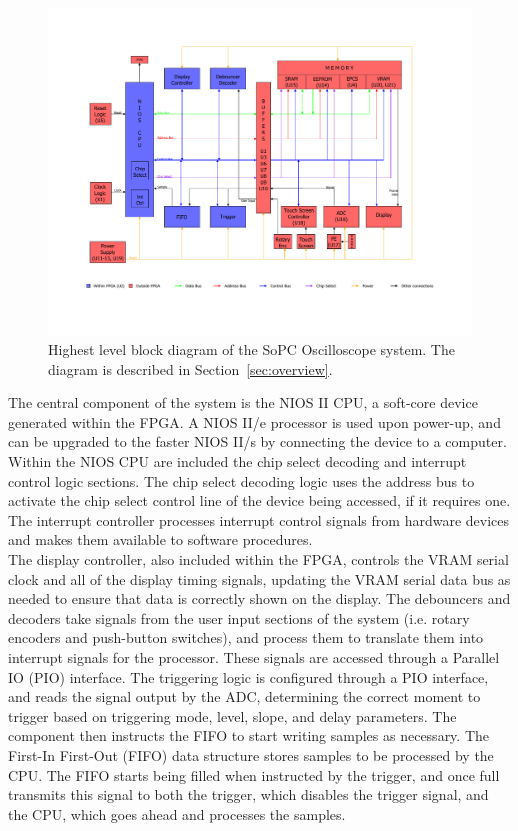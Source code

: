 \documentclass[titlepage]{scrartcl}
\begin{document}
	\begin{figure}[h!]
	\vspace{-4cm}
	\centerline{\includegraphics[width=29cm, angle=90, origin=c]{img/block_diagram.pdf}}
                	\caption{Highest level block diagram of the SoPC Oscilloscope system. The diagram is described in Section~\ref{sec:overview}.}
               	\label{fig:main_blocks}
	\end{figure}
	
	The central component of the system is the NIOS II CPU, a soft-core device generated within the FPGA. A NIOS II/e processor is used upon power-up, and can be upgraded to the faster NIOS II/s by connecting the device to a computer. Within the NIOS CPU are included the chip select decoding and interrupt control logic sections. The chip select decoding logic uses the address bus to activate the chip select control line of the device being accessed, if it requires one. The interrupt controller processes interrupt control signals from hardware devices and makes them available to software procedures.\\

	The display controller, also included within the FPGA, controls the VRAM serial clock and all of the display timing signals, updating the VRAM serial data bus as needed to ensure that data is correctly shown on the display. The debouncers and decoders take signals from the user input sections of the system (i.e. rotary encoders and push-button switches), and process them to translate them into interrupt signals for the processor. These signals are accessed through a Parallel IO (PIO) interface. The triggering logic is configured through a PIO interface, and reads the signal output by the ADC, determining the correct moment to trigger based on triggering mode, level, slope, and delay parameters. The component then instructs the FIFO to start writing samples as necessary. The First-In First-Out (FIFO) data structure stores samples to be processed by the CPU. The FIFO starts being filled when instructed by the trigger, and once full transmits this signal to both the trigger, which disables the trigger signal, and the CPU, which goes ahead and processes the samples.\\
\end{document}
